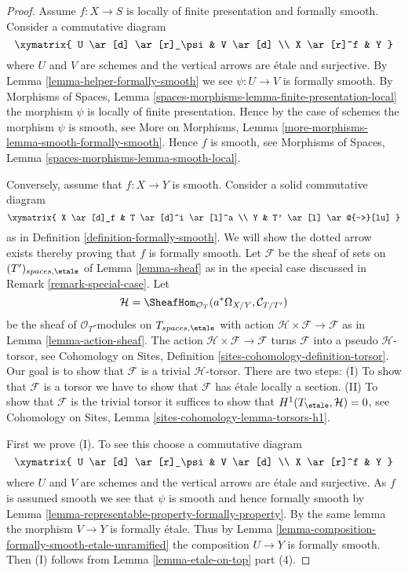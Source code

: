 \begin{proof}
Assume $f : X \to S$ is locally of finite presentation and formally smooth.
Consider a commutative diagram
$$
\xymatrix{
U \ar[d] \ar[r]_\psi & V \ar[d] \\
X \ar[r]^f & Y
}
$$
where $U$ and $V$ are schemes and the vertical arrows are \'etale and
surjective. By
Lemma \ref{lemma-helper-formally-smooth}
we see $\psi : U \to V$ is formally smooth. By
Morphisms of Spaces, Lemma
\ref{spaces-morphisms-lemma-finite-presentation-local}
the morphism $\psi$ is locally of finite presentation.
Hence by the case of schemes the morphism
$\psi$ is smooth, see
More on Morphisms, Lemma \ref{more-morphisms-lemma-smooth-formally-smooth}.
Hence $f$ is smooth, see
Morphisms of Spaces, Lemma
\ref{spaces-morphisms-lemma-smooth-local}.

\medskip\noindent
Conversely, assume that $f : X \to Y$ is smooth.
Consider a solid commutative diagram
$$
\xymatrix{
X \ar[d]_f & T \ar[d]^i \ar[l]^a \\
Y & T' \ar[l] \ar@{-->}[lu]
}
$$
as in Definition \ref{definition-formally-smooth}. We will show the
dotted arrow exists thereby proving that $f$ is formally smooth.
Let $\mathcal{F}$ be the sheaf of sets on $(T')_{spaces, \etale}$ of
Lemma \ref{lemma-sheaf} as in the special case discussed in
Remark \ref{remark-special-case}. Let
$$
\mathcal{H} =
\SheafHom_{\mathcal{O}_T}(a^*\Omega_{X/Y}, \mathcal{C}_{T/T'})
$$
be the sheaf of $\mathcal{O}_T$-modules on $T_{spaces, \etale}$
with action $\mathcal{H} \times \mathcal{F} \to \mathcal{F}$
as in Lemma \ref{lemma-action-sheaf}.
The action $\mathcal{H} \times \mathcal{F} \to \mathcal{F}$
turns $\mathcal{F}$ into a pseudo $\mathcal{H}$-torsor, see
Cohomology on Sites, Definition \ref{sites-cohomology-definition-torsor}.
Our goal is to show that $\mathcal{F}$ is a trivial $\mathcal{H}$-torsor.
There are two steps: (I) To show that $\mathcal{F}$ is a torsor
we have to show that $\mathcal{F}$ has \'etale locally a
section. (II) To show that $\mathcal{F}$ is the trivial torsor
it suffices to show that $H^1(T_\etale, \mathcal{H}) = 0$, see
Cohomology on Sites, Lemma \ref{sites-cohomology-lemma-torsors-h1}.

\medskip\noindent
First we prove (I). To see this choose a commutative diagram
$$
\xymatrix{
U \ar[d] \ar[r]_\psi & V \ar[d] \\
X \ar[r]^f & Y
}
$$
where $U$ and $V$ are schemes and the vertical arrows are \'etale and
surjective. As $f$ is assumed smooth we see that $\psi$ is smooth and
hence formally smooth by
Lemma \ref{lemma-representable-property-formally-property}.
By the same lemma the morphism $V \to Y$ is formally \'etale. Thus by
Lemma \ref{lemma-composition-formally-smooth-etale-unramified}
the composition $U \to Y$ is formally smooth. Then (I) follows from
Lemma \ref{lemma-etale-on-top} part (4).


\end{proof}
